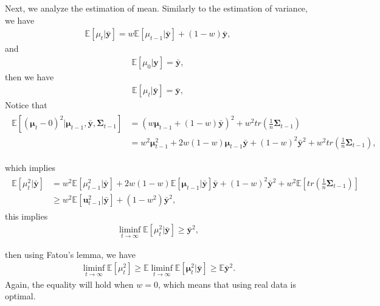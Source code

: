 Next, we analyze the estimation of mean. Similarly to the estimation of variance, we have 
\begin{align}
\mathbb{E}[\mu_t|\bar{\bm{y}}]=w\mathbb{E}[\mu_{t-1}|\bar{\bm{y}}]+(1-w)\bar{\bm{y}},
\end{align}
and 
\begin{align}
\mathbb{E}[\mu_0|\bm{y}]=\bar{\bm{y}},
\end{align}
then we have
\begin{align}
\mathbb{E}[\mu_t | \bar{\bm{y}}]=\bar{\bm{y}},
\end{align}
Notice that 
\begin{align}
\begin{split}
\mathbb{E}[(\bm{\mu}_t-0)^2|\bm{\mu}_{t-1},\bar{\bm{y}},\bm{\Sigma}_{t-1}]&=(w\bm{\mu}_{t-1}+(1-w)\bar{\bm{y}})^2+w^2 tr(\frac{1}{n}\bm{\Sigma}_{t-1}) \\ & = w^2 \bm{\mu}_{t-1}^2 +2w(1-w)\bm{\mu}_{t-1}\bar{\bm{y}}+(1-w)^2\bar{\bm{y}}^2 + w^2 tr(\frac{1}{n}\bm{\Sigma}_{t-1}),
\end{split}
\end{align}

which implies
\begin{align}
\begin{split}
\mathbb{E}[\mu_t^2 |\bar{\bm{y}}]&=w^2 \mathbb{E}[\mu_{t-1}^2|\bar{\bm{y}}]+2w(1-w)\mathbb{E}[\bm{\mu}_{t-1}|\bar{\bm{y}}]\bar{\bm{y}}+(1-w)^2\bar{\bm{y}}^2+w^2 \mathbb{E}[tr(\frac{1}{n}\bm{\Sigma}_{t-1})] \\ 
&\geq w^2 \mathbb{E}[\bm{u}_{t-1}^2 | \bar{\bm{y}}]+(1-w^2)\bar{\bm{y}}^2,
\end{split}
\end{align}
this implies 
\begin{align}
\liminf_{t \to \infty}\mathbb{E}[\mu_t^2 | \bar{\bm{y}}]\geq \bar{\bm
{y}}^2,
\end{align}

then using Fatou's lemma, we have
\begin{align}
\liminf_{t \to \infty}
\mathbb{E}[\mu_t^2]\geq \mathbb{E}
\liminf_{t \to \infty}
\mathbb{E}[\bm{\mu}_t^2 | \bar{\bm{y}}] \geq \mathbb{E}\bar{\bm{y}}^2.
\end{align}
Again, the equality will hold when $w=0$, which means that using real data is optimal.